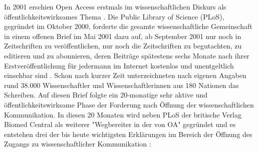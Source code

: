 In 2001 erschien Open Access erstmals im wissenschaftlichen Diskurs als öffentlichkeitswirksames Thema \cite{cite:19}. Die Public Library of Science (PLoS), gegründet im Oktober 2000, forderte die gesamte wissenschaftliche Gemeinschaft in einem offenen Brief im Mai 2001 dazu auf, ab September 2001 nur noch in Zeitschriften zu veröffentlichen, nur noch die Zeitschriften zu begutachten, zu editieren und zu abonnieren, deren Beiträge spätestens sechs Monate nach ihrer Erstveröffentlichung für jedermann im Internet kostenlos und unentgeltlich einsehbar sind \cite{cite:20}. Schon nach kurzer Zeit unterzeichneten nach eigenen Angaben \cite{cite:19a} rund 38.000 Wissenschaftler und Wissenschaftlerinnen aus 180 Nationen das Schreiben. Auf diesen Brief folgte ein 20-monatige sehr aktive und öffentlichkeitswirksame Phase der Forderung nach Öffnung der wissenschaftlichen Kommunikation. In diesen 20 Monaten wird neben PLoS der britische Verlag Biomed Central als weiterer "Wegbereiter in der von OA" \cite{suchen-Hoffmann-Zugang-undVerwertung-oeffentlicher-Informationen} gegründet und es entstehen drei der bis heute wichtigsten Erklärungen im Bereich der Öffnung des Zugangs zu wissenschaftlicher Kommunikation \cite{CREATe_2014}:
